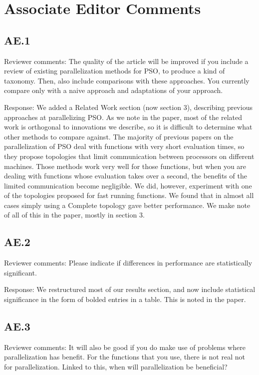 \documentclass[onecolumn, 12pt]{article}
\begin{document}
\section*{Associate Editor Comments}

\subsection*{AE.1}

Reviewer comments: The quality of the article will be improved if you include a
review of existing parallelization methods for PSO, to produce a kind of
taxonomy. Then, also include comparisons with these approaches. You currently
compare only with a naive approach and adaptations of your approach.

Response: We added a Related Work section (now section 3), describing previous
approaches at parallelizing PSO.  As we note in the paper, most of the related
work is orthogonal to innovations we describe, so it is difficult to determine
what other methods to compare against.  The majority of previous papers on the
parallelization of PSO deal with functions with very short evaluation times, so
they propose topologies that limit communication between processors on
different machines.  Those methods work very well for those functions, but when
you are dealing with functions whose evaluation takes over a second, the
benefits of the limited communication become negligible.  We did, however,
experiment with one of the topologies proposed for fast running functions.  We
found that in almost all cases simply using a Complete topology gave better
performance.  We make note of all of this in the paper, mostly in section 3.

\subsection*{AE.2}

Reviewer comments: Please indicate if differences in performance are
statistically significant.

Response: We restructured most of our results section, and now include
statistical significance in the form of bolded entries in a table.  This is
noted in the paper.

\subsection*{AE.3}

Reviewer comments: It will also be good if you do make use of problems where
parallelization has benefit. For the functions that you use, there is not real
not for parallelization. Linked to this, when will parallelization be
beneficial?
\end{document}
